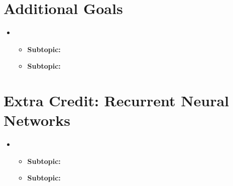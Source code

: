 
\section{Additional Goals}
\medskip
\begin{itemize}

    \item {}

    \begin{itemize}
    \item \textbf{Subtopic:}
    \item \textbf{Subtopic:}
    \end{itemize}

\end{itemize}


\section{Extra Credit: Recurrent Neural Networks}
\medskip
\begin{itemize}

    \item {}

    \begin{itemize}
    \item \textbf{Subtopic:}
    \item \textbf{Subtopic:}
    \end{itemize}

\end{itemize}


